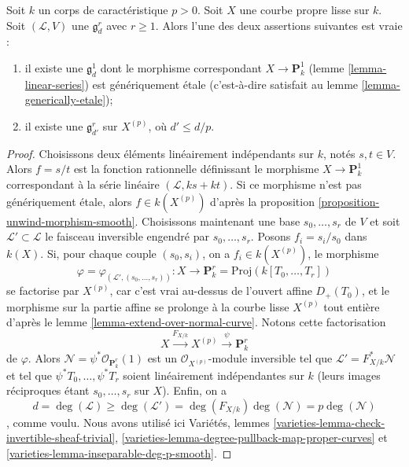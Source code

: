 \begin{lemma}
\label{lemma-inseparable-linear-system}
Soit $k$ un corps de caractéristique $p > 0$. Soit $X$ une courbe propre lisse sur $k$. Soit $(\mathcal{L}, V)$ une $\mathfrak g^r_d$ avec $r \geq 1$. Alors l'une des deux assertions suivantes est vraie : \begin{enumerate} \item il existe une $\mathfrak g^1_d$ dont le morphisme correspondant $X \to \mathbf{P}^1_k$ (lemme \ref{lemma-linear-series}) est génériquement \'etale (c'est-à-dire satisfait au lemme \ref{lemma-generically-etale}); \item il existe une $\mathfrak g^r_{d'}$ sur $X^{(p)}$, où $d' \leq d/p$.
\end{enumerate}
\end{lemma}

\begin{proof}
Choisissons deux éléments linéairement indépendants sur $k$, notés $s, t \in V$. Alors $f = s/t$ est la fonction rationnelle définissant le morphisme $X \to \mathbf{P}^1_k$ correspondant à la série linéaire $(\mathcal{L}, ks + kt)$. Si ce morphisme n'est pas génériquement \'etale, alors $f \in k(X^{(p)})$ d'après la proposition \ref{proposition-unwind-morphism-smooth}. Choisissons maintenant une base $s_0, \ldots, s_r$ de $V$ et soit $\mathcal{L}' \subset \mathcal{L}$ le faisceau inversible engendré par $s_0, \ldots, s_r$. Posons $f_i = s_i/s_0$ dans $k(X)$. Si, pour chaque couple $(s_0, s_i)$, on a $f_i \in k(X^{(p)})$, le morphisme $$
\varphi = \varphi_{(\mathcal{L}', (s_0, \ldots, s_r))} :
X
\longrightarrow
\mathbf{P}^r_k = \text{Proj}(k[T_0, \ldots, T_r])
$$ se factorise par $X^{(p)}$, car c'est vrai au-dessus de l'ouvert affine $D_+(T_0)$, et le morphisme sur la partie affine se prolonge à la courbe lisse $X^{(p)}$ tout entière d'après le lemme \ref{lemma-extend-over-normal-curve}. Notons cette factorisation $$
X \xrightarrow{F_{X/k}} X^{(p)} \xrightarrow{\psi} \mathbf{P}^r_k
$$ de $\varphi$. Alors $\mathcal{N} = \psi^*\mathcal{O}_{\mathbf{P}^r_k}(1)$ est un $\mathcal{O}_{X^{(p)}}$-module inversible tel que $\mathcal{L}' = F_{X/k}^*\mathcal{N}$ et tel que $\psi^*T_0, \ldots, \psi^*T_r$ soient linéairement indépendantes sur $k$ (leurs images réciproques étant $s_0, \ldots, s_r$ sur $X$). Enfin, on a $$
d = \deg(\mathcal{L}) \geq \deg(\mathcal{L}') =
\deg(F_{X/k}) \deg(\mathcal{N}) = p \deg(\mathcal{N})
$$, comme voulu. Nous avons utilisé ici Variétés, lemmes \ref{varieties-lemma-check-invertible-sheaf-trivial}, \ref{varieties-lemma-degree-pullback-map-proper-curves} et \ref{varieties-lemma-inseparable-deg-p-smooth}.
\end{proof}

